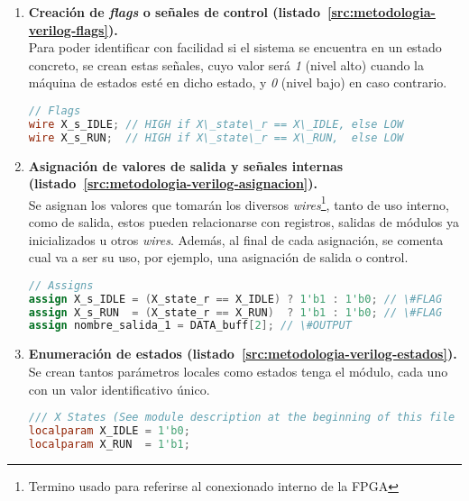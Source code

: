 \begin{enumerate}
    \item{\textbf{Creación de \textit{flags} o señales de control (listado~\ref{src:metodologia-verilog-flags}).}} \\
    Para poder identificar con facilidad si el sistema se encuentra en un estado concreto, se crean estas señales, cuyo valor será \textit{1} (nivel alto) cuando la máquina de estados esté en dicho estado, y \textit{0} (nivel bajo) en caso contrario.
    \begin{lstlisting}[language=Verilog,
        caption={Ejemplo de creación de \textit{flags}.},
        label=src:metodologia-verilog-flags]
// Flags
wire X_s_IDLE; // HIGH if X\_state\_r == X\_IDLE, else LOW
wire X_s_RUN;  // HIGH if X\_state\_r == X\_RUN,  else LOW
    \end{lstlisting}

    \item{\textbf{Asignación de valores de salida y señales internas (listado~\ref{src:metodologia-verilog-asignacion}).}} \\
    Se asignan los valores que tomarán los diversos \emph{wires}\footnote{Termino usado para referirse al conexionado interno de la FPGA}, tanto de uso interno, como de salida, estos pueden relacionarse con registros, salidas de módulos ya inicializados u otros \emph{wires}. Además, al final de cada asignación, se comenta cual va a ser su uso, por ejemplo, una asignación de salida o control.
    \begin{lstlisting}[language=Verilog,
        caption={Ejemplo de asignación de valores.},
        label=src:metodologia-verilog-asignacion]
// Assigns
assign X_s_IDLE = (X_state_r == X_IDLE) ? 1'b1 : 1'b0; // \#FLAG
assign X_s_RUN  = (X_state_r == X_RUN)  ? 1'b1 : 1'b0; // \#FLAG
assign nombre_salida_1 = DATA_buff[2]; // \#OUTPUT
    \end{lstlisting}
    

    \item{\textbf{Enumeración de estados (listado~\ref{src:metodologia-verilog-estados}).}} \\
    Se crean tantos parámetros locales como estados tenga el módulo, cada uno con un valor identificativo único.
    \begin{lstlisting}[language=Verilog,
        caption={Ejemplo de enumeración de estados.},
        label=src:metodologia-verilog-estados]
/// X States (See module description at the beginning of this file to get more info)
localparam X_IDLE = 1'b0;
localparam X_RUN  = 1'b1;
    \end{lstlisting}
    


\end{enumerate}
